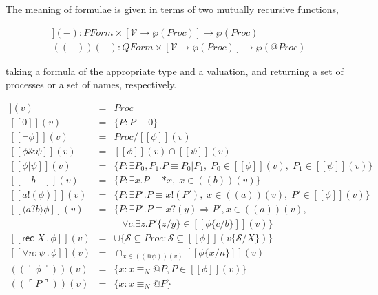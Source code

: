 \documentclass[]{amsart}
\makeatletter
\newcommand{\ldb}{[\![}
\newcommand{\rdb}{]\!]}
\newcommand{\ldrb}{(\!(}
\newcommand{\rdrb}{)\!)}
\newcommand{\lpquote}{\ulcorner}
\newcommand{\rpquote}{\urcorner}
\newcommand{\id}[1]{\texttt{#1}}
\newcommand{\pzero}{\mathbin{0}}
\newcommand{\juxtap}{\mathbin{\id{|}}}
\newcommand{\concat}{\Rightarrow}
\newcommand{\scong}{\mathbin{\equiv}}
\newcommand{\nameeq}{\mathbin{\equiv_N}}
\newcommand{\binpar}[2]{#1 \juxtap #2}
\newcommand{\prefix}[3]{#1 ? ( #2 ) \concat #3}
\newcommand{\lift}[2]{#1 ! ( #2 )}
\newcommand{\quotep}[1]{@#1}
\newcommand{\dropn}[1]{*#1}
\newcommand{\substn}[2]{\id{\{} #1 / #2 \id{\}}}
\newcommand{\pmeaningof}[1]{\ldb #1 \rdb}
\newcommand{\nmeaningof}[1]{\ldrb #1 \rdrb}
\newcommand{\Proc}{\mathbin{Proc}}
\newcommand{\QProc}{\quotep{\mathbin{Proc}}}
\newcommand{\ptrue}{\mathbin{true}}
\newcommand{\pdropf}[1]{\rpquote #1 \lpquote}
\newcommand{\pquotep}[1]{\lpquote #1 \rpquote}
\newcommand{\plift}[2]{#1 ! ( #2 )}
\newcommand{\pprefix}[3]{\langle #1 ? #2 \rangle #3}
\newcommand{\pgfp}[2]{\textsf{rec} \; #1 \mathbin{.} #2}
\newcommand{\pquant}[3]{\forall #1 \mathbin{:} #2 \mathbin{.} #3}
\newcommand{\PFormula}{\mathbin{PForm}}
\newcommand{\QFormula}{\mathbin{QForm}}
\newcommand{\PropVar}{\mathbin{\mathcal{V}}}
\theoremstyle{definition}
\theoremstyle{remark}
\numberwithin{equation}{subsection}
\makeatother
\begin{document}
The meaning of formulae is given in terms of two mutually recursive functions,

\begin{eqnarray}
\pmeaningof{ - }( - ) : \PFormula \times [\PropVar \to \wp(\Proc)] \to \wp(\Proc) \nonumber\\
\nmeaningof{ - }( - ) : \QFormula \times [\PropVar \to \wp(\Proc)] \to \wp(\QProc) \nonumber
\end{eqnarray}

\noindent taking a formula of the appropriate type and a valuation, and
returning a set of processes or a set of names, respectively.

\begin{eqnarray}
  \pmeaningof{\ptrue}(v) & = & \Proc \nonumber \\ 
  \pmeaningof{\pzero}(v) & = & \{ P : P \scong \pzero \} \nonumber \\ 
  \pmeaningof{\neg \phi}(v) & = & \Proc / \pmeaningof{\phi}(v) \nonumber\\
  \pmeaningof{\phi \& \psi}(v) & = & \pmeaningof{\phi}(v) \cap \pmeaningof{\psi}(v) \nonumber\\
  \pmeaningof{\binpar{\phi}{\psi}}(v) & = &
  \{ P : \exists P_0, P_1.P \scong \binpar{P_0}{P_1}, \; P_0 \in \pmeaningof{\phi}(v), \;  P_1 \in \pmeaningof{\psi}(v) \} \nonumber\\
  \pmeaningof{\pdropf{b}}(v) & = & \{ P : \exists x.P \scong {\dropn{x}}, \; x \in \nmeaningof{b}(v) \} \nonumber\\	
  \pmeaningof{\plift{a}{\phi}}(v) & = & \{ P : \exists P'.P \scong {\lift{x}{P'}},
                                           \; x \in \nmeaningof{a}(v), 
                                           \; P' \in \pmeaningof{\phi}(v) \} \nonumber\\
  \pmeaningof{\pprefix{a}{b}{\phi}}(v) & = & \{ P : \exists P'.P \scong {\prefix{x}{y}{P'}}, x \in \nmeaningof{a}(v), \nonumber\\
                                   &   &            \; \; \; \forall c . \exists z . {P'}\substn{z}{y} \in \pmeaningof{{\phi}\substn{c}{b}}(v) \} \nonumber\\
  \pmeaningof{\pgfp{X}{\phi}}(v) & = & \cup \{ \mathcal{S} \subseteq \Proc : \mathcal{S} \subseteq \pmeaningof{\phi}(v\substn{\mathcal{S}}{X})\} \nonumber\\
  \pmeaningof{\pquant{n}{\psi}{\phi}}(v) & = & \cap_{x \in \nmeaningof{\quotep{\psi}}(v)} \pmeaningof{{\phi}\substn{x}{n}}(v) \nonumber\\
  \nmeaningof{\pquotep{\phi}}(v) & = & \{ x : x \nameeq \quotep{P}, P \in \pmeaningof{\phi}(v) \} \nonumber\\
  \nmeaningof{\pquotep{P}}(v) & = & \{ x : x \nameeq  \quotep{P} \} \nonumber
\end{eqnarray}
\end{document}
